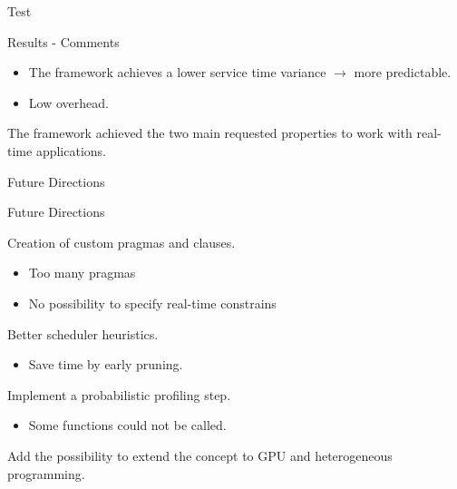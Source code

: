 \documentclass[xcolor=dvipsnames]{beamer}
\begin{document}
\begin{section}{Test}
\begin{frame}{\hskip 0.3cm Results - Comments}
\begin{itemize}
\item The framework achieves a lower service time variance $\rightarrow$ more predictable.

\item Low overhead.

\end{itemize}

The framework achieved the two main requested properties to work with real-time applications.

\end{frame}












\end{section}
\begin{section}{Future Directions}



\begin{frame}{\hskip 0.3cm Future Directions}



 Creation of custom pragmas and clauses.

\begin{itemize}

\item Too many pragmas 

\item No possibility to specify real-time constrains

\end{itemize}

  Better scheduler heuristics.

\begin{itemize}

\item Save time by early pruning.

\end{itemize}

 Implement a probabilistic profiling step.

\begin{itemize}

\item Some functions could not be called.

\end{itemize}

 Add the possibility to extend the concept to GPU and heterogeneous programming.




\end{frame}












\end{section}
\end{document}
